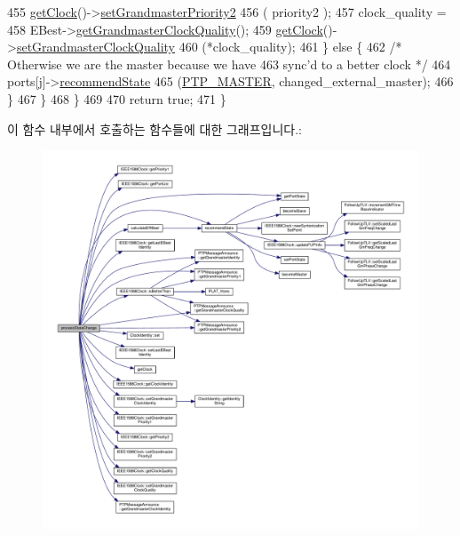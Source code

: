\begin{DoxyCode}
455                 \hyperlink{class_common_port_ab8e59ecfb51ec14e166bc8bfc872b1ef}{getClock}()->\hyperlink{class_i_e_e_e1588_clock_a74ab55d43941f7d4284d78c81e3cf8b3}{setGrandmasterPriority2}
456                     ( priority2 );
457                 clock\_quality =
458                     EBest->\hyperlink{class_p_t_p_message_announce_a4f7214e53f1413e39314947d39115809}{getGrandmasterClockQuality}();
459                 \hyperlink{class_common_port_ab8e59ecfb51ec14e166bc8bfc872b1ef}{getClock}()->\hyperlink{class_i_e_e_e1588_clock_af4c442ddfce5aaa4314821a118519e0a}{setGrandmasterClockQuality}
460                     (*clock\_quality);
461             \} \textcolor{keywordflow}{else} \{
462                 \textcolor{comment}{/* Otherwise we are the master because we have}
463 \textcolor{comment}{                   sync'd to a better clock */}
464                 ports[j]->\hyperlink{class_common_port_aa7588da5b66a33afeeda586e6abd334a}{recommendState}
465                     (\hyperlink{ptptypes_8hpp_a679431f1afc75d7bb9e972c022e53672ab4c763cac238b6403615a62111b64aa4}{PTP\_MASTER}, changed\_external\_master);
466             \}
467         \}
468     \}
469 
470     \textcolor{keywordflow}{return} \textcolor{keyword}{true};
471 \}
\end{DoxyCode}


이 함수 내부에서 호출하는 함수들에 대한 그래프입니다.\+:
\nopagebreak
\begin{figure}[H]
\begin{center}
\leavevmode
\includegraphics[width=350pt]{class_common_port_a11047fcdc1e80ee322dba467a051698b_cgraph}
\end{center}
\end{figure}





